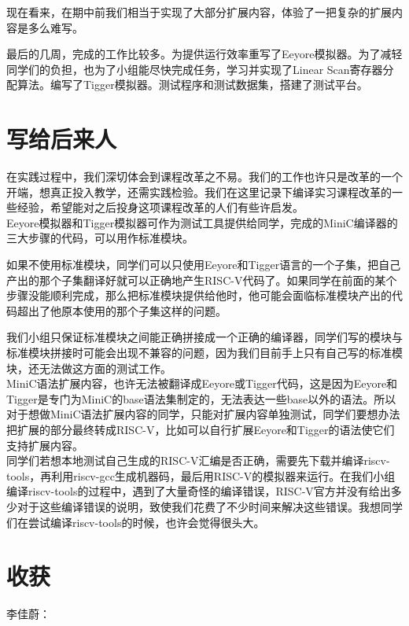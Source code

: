 \documentclass[a4paper]{ctexart}
\begin{document}
现在看来，在期中前我们相当于实现了大部分扩展内容，体验了一把复杂的扩展内容是多么难写。

最后的几周，完成的工作比较多。为提供运行效率重写了Eeyore模拟器。为了减轻同学们的负担，也为了小组能尽快完成任务，学习并实现了Linear Scan寄存器分配算法。编写了Tigger模拟器。测试程序和测试数据集，搭建了测试平台。

\newpage
\section{写给后来人}

在实践过程中，我们深切体会到课程改革之不易。我们的工作也许只是改革的一个开端，想真正投入教学，还需实践检验。我们在这里记录下编译实习课程改革的一些经验，希望能对之后投身这项课程改革的人们有些许启发。
\\

Eeyore模拟器和Tigger模拟器可作为测试工具提供给同学，完成的MiniC编译器的三大步骤的代码，可以用作标准模块。

如果不使用标准模块，同学们可以只使用Eeyore和Tigger语言的一个子集，把自己产出的那个子集翻译好就可以正确地产生RISC-V代码了。如果同学在前面的某个步骤没能顺利完成，那么把标准模块提供给他时，他可能会面临标准模块产出的代码超出了他原本使用的那个子集这样的问题。

我们小组只保证标准模块之间能正确拼接成一个正确的编译器，同学们写的模块与标准模块拼接时可能会出现不兼容的问题，因为我们目前手上只有自己写的标准模块，还无法做这方面的测试工作。
\\

MiniC语法扩展内容，也许无法被翻译成Eeyore或Tigger代码，这是因为Eeyore和Tigger是专门为MiniC的base语法集制定的，无法表达一些base以外的语法。所以对于想做MiniC语法扩展内容的同学，只能对扩展内容单独测试，同学们要想办法把扩展的部分最终转成RISC-V，比如可以自行扩展Eeyore和Tigger的语法使它们支持扩展内容。
\\

同学们若想本地测试自己生成的RISC-V汇编是否正确，需要先下载并编译riscv-tools，再利用riscv-gcc生成机器码，最后用RISC-V的模拟器来运行。在我们小组编译riscv-tools的过程中，遇到了大量奇怪的编译错误，RISC-V官方并没有给出多少对于这些编译错误的说明，致使我们花费了不少时间来解决这些错误。我想同学们在尝试编译riscv-tools的时候，也许会觉得很头大。

\newpage
\section{收获}

\noindent 李佳蔚：
\end{document}
